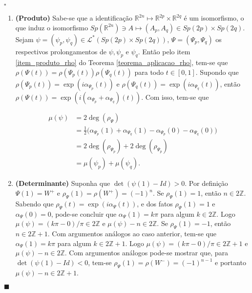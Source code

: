 \documentclass[12pt]{book}
\newenvironment{prova}[1]{$\square$ #1}{\hfill$\blacksquare$}
\newcommand{\caminhosespeciais}[1]{\mathcal{L}^{*}(#1)}
\newcommand{\gruposimpletico}[1]{Sp(#1)}
\newcommand{\inteiros}{\mathbb{Z}}
\newcommand{\intervalo}{[0,1]}
\newcommand{\real}[1]{\mathbb{R}^{#1}}
\begin{document}
\begin{prova}
\begin{enumerate}
			\item \textbf{(Produto)} Sabe-se que a identificação $\real{2n} \mapsto \real{2p}\times \real{2q}$ é um isomorfismo, o que induz o isomorfismo $\gruposimpletico{\real{2n}} \ni A \mapsto (A_{p}, A_{q}) \in \gruposimpletico{2p} \times \gruposimpletico{2q}$. Sejam $\psi=(\psi_{p}, \psi_{q}) \in \caminhosespeciais{\gruposimpletico{2p}\times \gruposimpletico{2q}}$, $\Psi=(\Psi_{p}, \Psi_{q})$ os respectivos prolongamentos de $\psi, \psi_{p}$ e $\psi_{q}$. Então pelo item \ref{item_produto_rho} do Teorema \ref{teorema_aplicacao_rho}, tem-se que $\rho(\Psi(t))=\rho(\Psi_{p}(t))\rho(\Psi_{q}(t))$ para todo $t\in \intervalo$. Supondo que $\rho(\Psi_{p}(t))=\exp(i\alpha_{\Psi_{p}}(t))$ e $\rho(\Psi_{q}(t))=\exp(i\alpha_{\Psi_{q}}(t))$, então $\rho(\Psi(t)) = \exp(i(\alpha_{\Psi_{p}}+\alpha_{\Psi_{q}})(t))$. Com isso, tem-se que 
			
			$$
			\begin{aligned}
			\mu(\psi) &= 2\deg(\rho_{\Psi}) 
			\\
			&= \frac{1}{2}\big(\alpha_{\Psi_{p}}(1)+\alpha_{\Psi_{q}}(1) -\alpha_{\Psi_{p}}(0)-\alpha_{\Psi_{q}}(0) \big) 
			\\
			&= 2\deg(\rho_{\Psi_{p}}) +2\deg(\rho_{\Psi_{p}}) 
			\\
			&=\mu(\psi_{p})+\mu(\psi_{q}).
			\end{aligned}
			$$
			
			\item \textbf{(Determinante)} Suponha que  $\det(\psi(1)- Id)>0$. Por definição $\Psi(1)=W^{+}$ e $\rho_{\Psi}(1) = \rho(W^{+}) = (-1)^{n}$. Se $\rho_{\Psi}(1) =1$, então $n\in 2\inteiros$. Sabendo que $\rho_{\Psi}(t) = \exp(i\alpha_{\Psi}(t))$, e dos fatos $\rho_{\Psi}(1) = 1$ e $\alpha_{\Psi}(0) = 0$, pode-se concluir que $\alpha_{\Psi}(1)=k\pi$ para algum $k \in 2\inteiros$. Logo $\mu(\psi) = (k\pi-0)/\pi \in 2\inteiros$ e $\mu(\psi)-n \in 2\inteiros$. Se $\rho_{\Psi}(1) =-1$, então $n\in 2\inteiros+1$. Com argumentos análogos ao caso anterior, tem-se que $\alpha_{\Psi}(1) = k\pi$ para algum $k\in 2\inteiros+1$. Logo $\mu(\psi) = (k\pi-0)/\pi \in 2\inteiros+1$ e $\mu(\psi)-n \in 2\inteiros$. Com argumentos análogos pode-se mostrar que, para $\det(\psi(1)- Id)<0$, tem-se  $\rho_{\Psi}(1) = \rho(W^{-}) = (-1)^{n-1}$ e portanto $\mu(\psi)-n \in 2\inteiros +1$.
			

\end{enumerate}
\end{prova}
\end{document}
